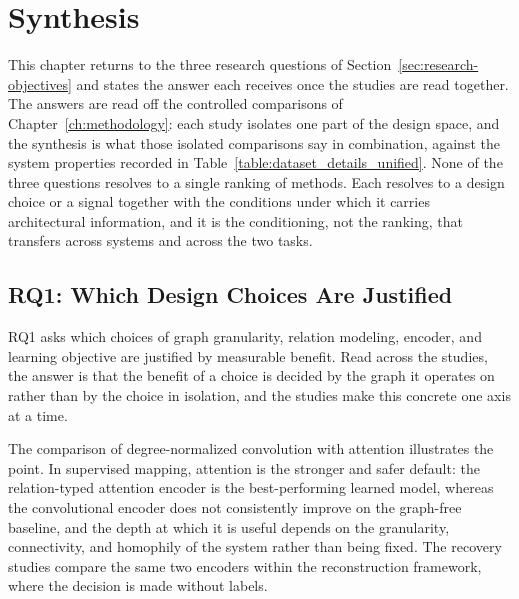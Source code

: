 \chapter{Synthesis}
\label{ch:synthesis}
 \chaptertoc
 
This chapter returns to the three research questions of Section~\ref{sec:research-objectives} and states the answer each receives once the studies are read together. The answers are read off the controlled comparisons of Chapter~\ref{ch:methodology}: each study isolates one part of the design space, and the synthesis is what those isolated comparisons say in combination, against the system properties recorded in Table~\ref{table:dataset_details_unified}. None of the three questions resolves to a single ranking of methods. Each resolves to a design choice or a signal together with the conditions under which it carries architectural information, and it is the conditioning, not the ranking, that transfers across systems and across the two tasks.
 
\section{RQ1: Which Design Choices Are Justified}
\label{sec:syn-rq1}
 
RQ1 asks which choices of graph granularity, relation modeling, encoder, and learning objective are justified by measurable benefit. Read across the studies, the answer is that the benefit of a choice is decided by the graph it operates on rather than by the choice in isolation, and the studies make this concrete one axis at a time.
 
The comparison of degree-normalized convolution with attention illustrates the point. In supervised mapping, attention is the stronger and safer default: the relation-typed attention encoder is the best-performing learned model, whereas the convolutional encoder does not consistently improve on the graph-free baseline, and the depth at which it is useful depends on the granularity, connectivity, and homophily of the system rather than being fixed. %
The recovery studies compare the same two encoders within the reconstruction framework, where the decision is made without labels. %
 

